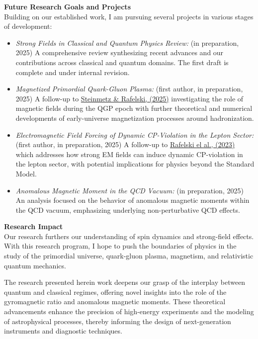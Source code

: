 \documentclass[11pt]{article}
\begin{document}
{\noindent\Large\textbf{Future Research Goals and Projects}}\\
Building on our established work, I am pursuing several projects in various stages of development:
\begin{itemize}[leftmargin=1.5em,nosep]
    \item \emph{Strong Fields in Classical and Quantum Physics Review:} (in preparation, 2025) A comprehensive review synthesizing recent advances and our contributions across classical and quantum domains. The first draft is complete and under internal revision.
    \item \emph{Magnetized Primordial Quark-Gluon Plasma:} (first author, in preparation, 2025) A follow-up to \href{https://doi.org/10.1140/epjs/s11734-025-01625-9}{Steinmetz \& Rafelski, (2025)} investigating the role of magnetic fields during the QGP epoch with further theoretical and numerical developments of early-universe magnetization processes around hadronization.
    \item \emph{Electromagnetic Field Forcing of Dynamic CP-Violation in the Lepton Sector:} (first author, in preparation, 2025) A follow-up to \href{https://doi.org/10.1142/S0217751X23501634}{Rafelski el al., (2023)} which addresses how strong EM fields can induce dynamic CP-violation in the lepton sector, with potential implications for physics beyond the Standard Model.
    \item \emph{Anomalous Magnetic Moment in the QCD Vacuum:} (in preparation, 2025) An analysis focused on the behavior of anomalous magnetic moments within the QCD vacuum, emphasizing underlying non-perturbative QCD effects.
\end{itemize}

\vspace{1em}

{\noindent\Large\textbf{Research Impact}}\\
Our research furthers our understanding of spin dynamics and strong-field effects. With this research program, I hope to push the boundaries of physics in the study of the primordial universe, quark-gluon plasma, magnetism, and relativistic quantum mechanics.

The research presented herein work deepens our grasp of the interplay between quantum and classical regimes, offering novel insights into the role of the gyromagnetic ratio and anomalous magnetic moments. These theoretical advancements enhance the precision of high-energy experiments and the modeling of astrophysical processes, thereby informing the design of next-generation instruments and diagnostic techniques.
\end{document}
